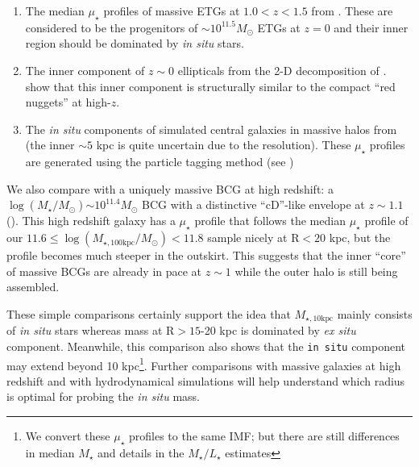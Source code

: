\documentclass[a4paper,fleqn,usenatbib]{mnras}
\def\mstar{{$M_{\star}$}}
\def\logms{{$\log (M_{\star}/M_{\odot})$}}
\def\minn{{$M_{\star,10\mathrm{kpc}}$}}
\def\logmtot{{$\log (M_{\star,100\mathrm{kpc}}/M_{\odot})$}}
\def\m2l{{$M_{\star}/L_{\star}$}}
\def\mden{{$\mu_{\star}$}}
\begin{document}
    \begin{enumerate}
        
        \item The median \mden{} profiles of massive ETGs at $1.0 < z < 1.5$ from
            \citealt{Patel2013}.
            These are considered to be the progenitors of 
            ${\sim} 10^{11.5} M_{\odot}$ ETGs at $z=0$ and their inner region 
            should be dominated by \textit{in situ} stars. 
    
        \item The inner component of $z{\sim} 0$ ellipticals from the 2-D 
            decomposition of \citet{Huang2013a}. 
            \citet{Huang2013b} show that this inner component is structurally 
            similar to the compact ``red nuggets'' at high-$z$. 
            
        \item The \textit{in situ} components of simulated central galaxies in 
            massive halos from \citet{Cooper2013} (the inner ${\sim} 5$ kpc is 
            quite uncertain due to the resolution).  
            These \mden{} profiles are generated using the particle tagging 
            method (see \citealt{Cooper2010})
    
    \end{enumerate}

    We also compare with a uniquely massive BCG at high redshift: 
    a \logms{}${\sim} 10^{11.4} M_{\odot}$ BCG with a distinctive ``cD''-like envelope 
    at $z{\sim} 1.1$ (\citealt{Liu2013}).  
    This high redshift galaxy has a \mden{} profile that follows the median \mden{} 
    profile of our $11.6\leq$\logmtot{}$<11.8$ sample nicely at $\mathrm{R} < 20$ 
    kpc, but the profile becomes much steeper in the outskirt. 
    This suggests that the inner ``core'' of massive BCGs are already in pace at 
    $z{\sim} 1$ while the outer halo is still being assembled. 

    These simple comparisons certainly support the idea that \minn{} mainly consists 
    of \textit{in situ} stars whereas mass at $\mathrm{R} > 15$-20 kpc is dominated 
    by \textit{ex situ} component.  
    Meanwhile, this comparison also shows that the \texttt{in situ} component may 
    extend beyond 10 kpc\footnote{We convert these \mden{} profiles to the same 
    \citealt{Chabrier2003} IMF; but there are still differences in median \mstar{} 
    and details in the \m2l{} estimates}. 
    Further comparisons with massive galaxies at high redshift and with 
    hydrodynamical simulations will help understand which radius is optimal for 
    probing the \textit{in situ} mass.
      
\end{document}
